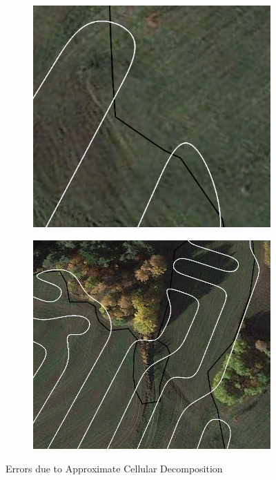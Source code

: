 \begin{figure}[ht]
	\centering
	\begin{subfigure}{.49\textwidth}
	  \centering
	  \includegraphics[width=.9\linewidth]{figures/C3/Field3/Field3-imperfection.png}
	  \caption{}
	  \label{sfig:CPP-imperfection1}
	\end{subfigure}
	\begin{subfigure}{.49\textwidth}
	  \centering
	  \includegraphics[width=.95\linewidth]{figures/C3/Field3/Field3-imperfection2.png}
	  \caption{}
	  \label{sfig:CPP-imperfection2}
	\end{subfigure}
	\caption{Errors due to Approximate Cellular Decomposition}
    \label{fig:CPP-imperfections}
\end{figure}
